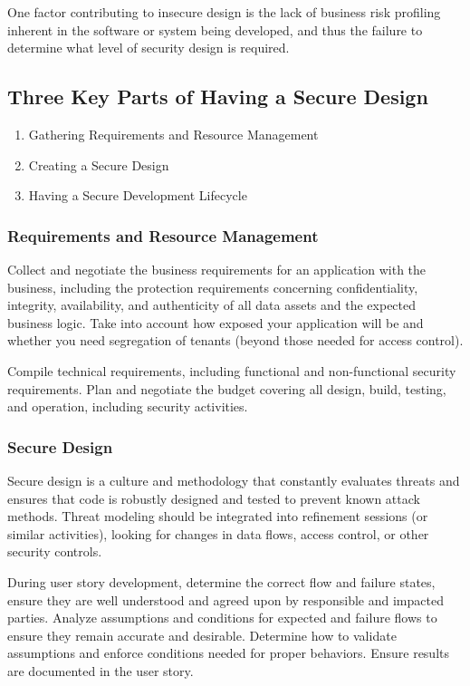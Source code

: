 \documentclass[11pt]{article}
\begin{document}
One factor contributing to insecure design is the lack of business risk profiling inherent in the software or system being developed, and thus the failure to determine what level of security design is required.

\subsection{Three Key Parts of Having a Secure Design}
\begin{keyparts}
\begin{enumerate}
  \item Gathering Requirements and Resource Management
  \item Creating a Secure Design
  \item Having a Secure Development Lifecycle
\end{enumerate}
\end{keyparts}

\subsubsection{Requirements and Resource Management}
Collect and negotiate the business requirements for an application with the business, including the protection requirements concerning confidentiality, integrity, availability, and authenticity of all data assets and the expected business logic. Take into account how exposed your application will be and whether you need segregation of tenants (beyond those needed for access control).

Compile technical requirements, including functional and non-functional security requirements. Plan and negotiate the budget covering all design, build, testing, and operation, including security activities.

\subsubsection{Secure Design}
Secure design is a culture and methodology that constantly evaluates threats and ensures that code is robustly designed and tested to prevent known attack methods. Threat modeling should be integrated into refinement sessions (or similar activities), looking for changes in data flows, access control, or other security controls.

During user story development, determine the correct flow and failure states, ensure they are well understood and agreed upon by responsible and impacted parties. Analyze assumptions and conditions for expected and failure flows to ensure they remain accurate and desirable. Determine how to validate assumptions and enforce conditions needed for proper behaviors. Ensure results are documented in the user story.
\end{document}
